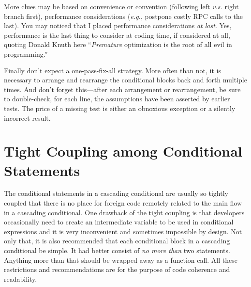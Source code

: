 \documentclass[oneside,11pt]{book}
\theoremstyle{definition}
\theoremstyle{remark}
\begin{document}
More clues may be based on convenience or convention (following left \textit{v.s.}
right branch first), performance considerations (\textit{e.g.}, postpone costly RPC calls to the
last).
You may noticed that I placed performance considerations \emph{at last}.
Yes, performance is the last thing to consider at coding time, if considered at all,
quoting Donald Knuth here ``\emph{Premature} optimization is the root of all evil in programming.''


Finally don't expect a one-pass-fix-all strategy.
More often than not, it is necessary to arrange and rearrange the conditional blocks back and forth
multiple times.
And don't forget this---after each arrangement or rearrangement, be sure to
double-check, for each line, the assumptions have been asserted by earlier tests.
The price of a missing test is either an obnoxious exception or a silently incorrect result.













\section{Tight Coupling among Conditional Statements}\label{sec:tightcoupling}

The conditional statements in a cascading conditional are usually so tightly coupled that
there is no place for foreign code remotely related to the main flow in a cascading conditional.
One drawback of the tight coupling is that developers occasionally need to create an intermediate
variable to be used in conditional expressions and
it is very inconvenient and sometimes impossible by design.
Not only that, it is also recommended that each conditional block in a cascading conditional be
simple.
It had better consist of \emph{no more than} two statements.
Anything more than that should be wrapped away as a function call.
All these restrictions and recommendations are for the purpose of code coherence and readability.
\end{document}

